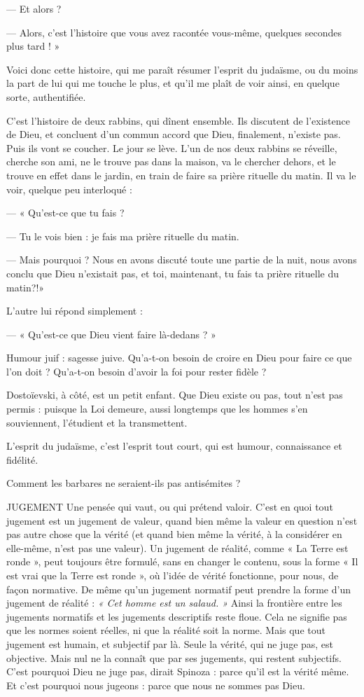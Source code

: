 {— Et alors ?

— Alors, c’est l’histoire que vous avez racontée vous-même, quelques
secondes plus tard ! »

Voici donc cette histoire, qui me paraît résumer l’esprit du judaïsme, ou du
moins la part de lui qui me touche le plus, et qu’il me plaît de voir ainsi, en
quelque sorte, authentifiée.

C’est l’histoire de deux rabbins, qui dînent ensemble. Ils discutent de l’existence
de Dieu, et concluent d’un commun accord que Dieu, finalement,
n'existe pas. Puis ils vont se coucher. Le jour se lève. L'un de nos deux rabbins
se réveille, cherche son ami, ne le trouve pas dans la maison, va le chercher
dehors, et le trouve en effet dans le jardin, en train de faire sa prière rituelle du
matin. Il va le voir, quelque peu interloqué :

— « Qu'est-ce que tu fais ?

— Tu le vois bien : je fais ma prière rituelle du matin.

— Mais pourquoi ? Nous en avons discuté toute une partie de la nuit, nous
avons conclu que Dieu n'existait pas, et toi, maintenant, tu fais ta prière rituelle
du matin?!»

L'autre lui répond simplement :

— « Qu'est-ce que Dieu vient faire là-dedans ? »

Humour juif : sagesse juive. Qu’a-t-on besoin de croire en Dieu pour faire
ce que l’on doit ? Qu’a-t-on besoin d’avoir la foi pour rester fidèle ?

Dostoïevski, à côté, est un petit enfant. Que Dieu existe ou pas, tout n’est
pas permis : puisque la Loi demeure, aussi longtemps que les hommes s’en souviennent,
l’étudient et la transmettent.

L'esprit du judaïsme, c’est l’esprit tout court, qui est humour, connaissance
et fidélité.

Comment les barbares ne seraient-ils pas antisémites ?

JUGEMENT Une pensée qui vaut, ou qui prétend valoir. C’est en quoi tout
jugement est un jugement de valeur, quand bien même la
valeur en question n’est pas autre chose que la vérité (et quand bien même la
vérité, à la considérer en elle-même, n’est pas une valeur). Un jugement de réalité,
comme « La Terre est ronde », peut toujours être formulé, sans en changer
le contenu, sous la forme « Il est vrai que la Terre est ronde », où l’idée de vérité
fonctionne, pour nous, de façon normative. De même qu’un jugement normatif
peut prendre la forme d’un jugement de réalité : {\it « Cet homme est un
salaud. »} Ainsi la frontière entre les jugements normatifs et les jugements descriptifs
reste floue. Cela ne signifie pas que les normes soient réelles, ni que la
réalité soit la norme. Mais que tout jugement est humain, et subjectif par là.
Seule la vérité, qui ne juge pas, est objective. Mais nul ne la connaît que par ses
jugements, qui restent subjectifs. C’est pourquoi Dieu ne juge pas, dirait
Spinoza : parce qu’il est la vérité même. Et c’est pourquoi nous jugeons : parce
que nous ne sommes pas Dieu.

}

